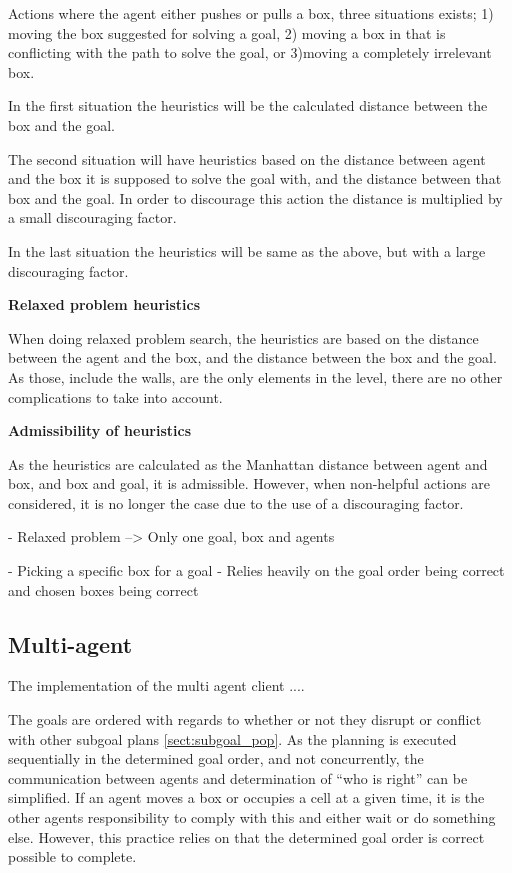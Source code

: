 \documentclass[Main]{subfiles}
\begin{document}
Actions where the agent either pushes or pulls a box, three situations exists; 1) moving the box suggested for solving a goal, 2) moving a box in that is conflicting with the path to solve the goal, or 3)moving a completely irrelevant box. 

In the first situation the heuristics will be the calculated distance between the box and the goal.

The second situation will have heuristics based on the distance between agent and the box it is supposed to solve the goal with, and the distance between that box and the goal. In order to discourage this action the distance is multiplied by a small discouraging factor.

In the last situation the heuristics will be same as the above, but with a large discouraging factor. 


\textbf{Relaxed problem heuristics}

When doing relaxed problem search, the heuristics are based on the distance between the agent and the box, and the distance between the box and the goal. As those, include the walls, are the only elements in the level, there are no other complications to take into account. 



\textbf{Admissibility of heuristics}

As the heuristics are calculated as the Manhattan distance between agent and box, and box and goal, it is admissible. However, when non-helpful actions are considered, it is no longer the case due to the use of a discouraging factor. 



- Relaxed problem --> Only one goal, box and agents

- Picking a specific box for a goal
- Relies heavily on the goal order being correct and chosen boxes being correct





\subsection{Multi-agent} 

The implementation of the multi agent client  .... 



The goals are ordered with regards to whether or not they disrupt or conflict with other subgoal plans \autoref{sect:subgoal_pop}. As the planning is executed sequentially in the determined goal order, and not concurrently, the communication between agents and determination of ``who is right'' can be simplified. 
If an agent moves a box or occupies a cell at a given time, it is the other agents responsibility to comply with this and either wait or do something else. However, this practice relies on that the determined goal order is correct possible to complete. 
\end{document}
